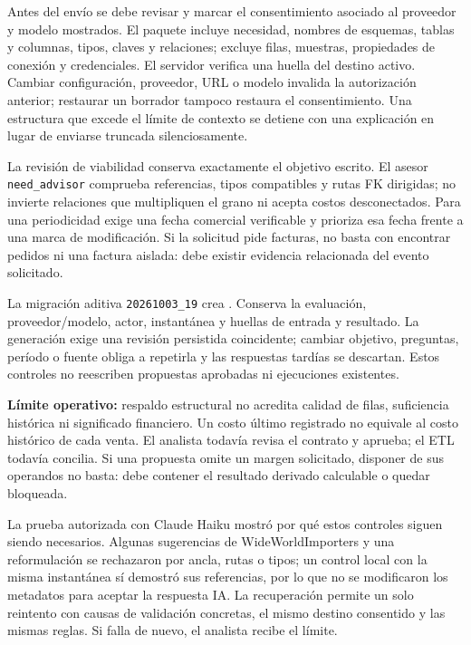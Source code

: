 \documentclass[11pt,letterpaper]{article}
\newcommand{\file}[1]{\texttt{#1}}
\begin{document}
Antes del envío se debe revisar y marcar el consentimiento asociado al proveedor y
modelo mostrados. El paquete incluye necesidad, nombres de esquemas, tablas y columnas,
tipos, claves y relaciones; excluye filas, muestras, propiedades de conexión y
credenciales. El servidor verifica una huella del destino activo. Cambiar configuración,
proveedor, URL o modelo invalida la autorización anterior; restaurar un borrador tampoco
restaura el consentimiento. Una estructura que excede el límite de contexto se detiene
con una explicación en lugar de enviarse truncada silenciosamente.

La revisión de viabilidad conserva exactamente el objetivo escrito. El asesor
\file{need\_advisor} comprueba referencias, tipos compatibles y rutas FK dirigidas; no
invierte relaciones que multipliquen el grano ni acepta costos desconectados. Para una
periodicidad exige una fecha comercial verificable y prioriza esa fecha frente a una
marca de modificación. Si la solicitud pide facturas, no basta con encontrar pedidos
ni una factura aislada: debe existir evidencia relacionada del evento solicitado.

La migración aditiva \file{20261003\_19} crea .
Conserva la evaluación, proveedor/modelo, actor, instantánea y huellas de entrada y
resultado. La generación exige una revisión persistida coincidente; cambiar objetivo,
preguntas, período o fuente obliga a repetirla y las respuestas tardías se descartan.
Estos controles no reescriben propuestas aprobadas ni ejecuciones existentes.

\textbf{Límite operativo:} respaldo estructural no acredita calidad de filas, suficiencia
histórica ni significado financiero. Un costo último registrado no equivale al costo
histórico de cada venta. El analista todavía revisa el contrato y aprueba; el ETL todavía
concilia. Si una propuesta omite un margen solicitado, disponer de sus operandos no
basta: debe contener el resultado derivado calculable o quedar bloqueada.

La prueba autorizada con Claude Haiku mostró por qué estos controles siguen siendo
necesarios. Algunas sugerencias de WideWorldImporters y una reformulación se rechazaron
por ancla, rutas o tipos; un control local con la misma instantánea sí demostró sus
referencias, por lo que no se modificaron los metadatos para aceptar la respuesta IA.
La recuperación permite un solo reintento con causas de validación concretas, el mismo
destino consentido y las mismas reglas. Si falla de nuevo, el analista recibe el límite.
\end{document}
